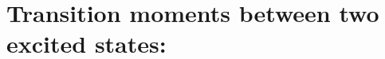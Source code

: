 
\section{Transition moments between two excited states: }
\label{sec:ccqr2r}

\begin{description}
\item[] 
%
\item[] 
%
\item[] 
%
\item[] 
%
\item[] 
%
\end{description}
